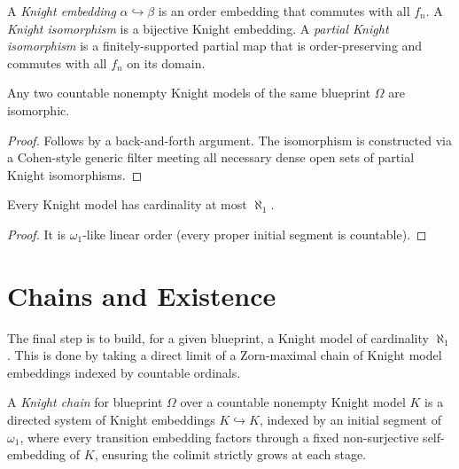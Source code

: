 \begin{definition}
  \label{def:knight-iso}
  \leanok
  A \emph{Knight embedding} $\alpha \hookrightarrow \beta$ is an order embedding that commutes with all $f_n$. A \emph{Knight isomorphism} is a bijective Knight embedding. A \emph{partial Knight isomorphism} is a finitely-supported partial map that is order-preserving and commutes with all $f_n$ on its domain.
\end{definition}

\begin{theorem}
  \label{thm:countable-generic-iso}
  \leanok
  Any two countable nonempty Knight models of the same blueprint $\Omega$ are isomorphic.
\end{theorem}

\begin{proof}
  \leanok
  Follows by a back-and-forth argument. The isomorphism is constructed via a Cohen-style generic filter meeting all necessary dense open sets of partial Knight isomorphisms.
\end{proof}

\begin{theorem}
  \label{thm:knight-model-card-bound}
  \leanok
  Every Knight model has cardinality at most $\aleph_1$.
\end{theorem}

\begin{proof}
  \leanok
  It is $\omega_1$-like linear order (every proper initial segment is countable).
\end{proof}


\section{Chains and Existence}\label{sec:chains}

The final step is to build, for a given blueprint, a Knight model of cardinality $\aleph_1$. This is done by taking a direct limit of a Zorn-maximal chain of Knight model embeddings indexed by countable ordinals.

\begin{definition}
  \label{def:knight-chain}
  \leanok
  A \emph{Knight chain} for blueprint $\Omega$ over a countable nonempty Knight model $K$ is a directed system of Knight embeddings $K \hookrightarrow K$, indexed by an initial segment of $\omega_1$, where every transition embedding factors through a fixed non-surjective self-embedding of $K$, ensuring the colimit strictly grows at each stage.
\end{definition}

